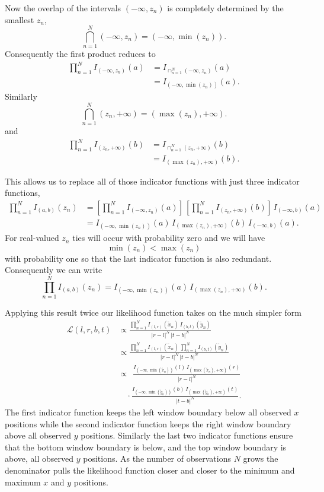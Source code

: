 \documentclass[
  letterpaper,
  DIV=11,
  numbers=noendperiod]{scrartcl}
\begin{document}
Now the overlap of the intervals \((-\infty, z_{n})\) is completely
determined by the smallest \(z_{n}\), \[
\bigcap_{n = 1}^{N} (-\infty, z_{n}) = (-\infty, \min(z_{n})).
\] Consequently the first product reduces to \begin{align*}
\prod_{n = 1}^{N} I_{(-\infty, z_{n})}(a)
&=
I_{ \cap_{n = 1}^{N} (-\infty, z_{n}) }(a)
\\
&=
I_{ (-\infty, \min(z_{n})) }(a).
\end{align*} Similarly \[
\bigcap_{n = 1}^{N} (z_{n}, +\infty) = (\max(z_{n}), +\infty).
\] and \begin{align*}
\prod_{n = 1}^{N} I_{(z_{n}, +\infty)}(b)
&=
I_{ \cap_{n = 1}^{N} (z_{n}, +\infty) }(b)
\\
&=
I_{ (\max(z_{n}), +\infty) }(b).
\end{align*}

This allows us to replace all of those indicator functions with just
three indicator functions, \begin{align*}
\prod_{n = 1}^{N}
I_{(a, b)}(z_{n})
&=
\left[ \prod_{n = 1}^{N} I_{(-\infty, z_{n})}(a) \right] \,
\left[ \prod_{n = 1}^{N} I_{(z_{n}, +\infty)}(b) \right] \,
I_{(-\infty, b)}(a)
\\
&=
I_{ (-\infty, \min(z_{n})) }(a) \,
I_{ (\max(z_{n}), +\infty) }(b) \,
I_{(-\infty, b)}(a).
\end{align*} For real-valued \(z_{n}\) ties will occur with probability
zero and we will have \[
\min(z_{n}) < \max(z_{n})
\] with probability one so that the last indicator function is also
redundant. Consequently we can write \[
\prod_{n = 1}^{N}
I_{(a, b)}(z_{n})
=
I_{ (-\infty, \min(z_{n})) }(a) \,
I_{ (\max(z_{n}), +\infty) }(b).
\]

Applying this result twice our likelihood function takes on the much
simpler form \begin{align*}
\mathcal{L}(l, r, b, t)
&\propto
\frac{
  \prod_{n = 1}^{N} I_{(l, r)}( \tilde{x}_{n}) \, I_{(b, t)}( \tilde{y}_{n})
}
{
  | r - l |^{N} \, | t - b |^{N}
}
\\
&\propto
\frac{
  \prod_{n = 1}^{N} I_{(l, r)}( \tilde{x}_{n}) \,
  \prod_{n = 1}^{N} I_{(b, t)}( \tilde{y}_{n})
}
{
  | r - l |^{N} \, | t - b |^{N}
}
\\
&\propto \;\,
\frac{
  I_{ (-\infty, \min(\tilde{x}_{n})) }(l) \,
  I_{ (\max(\tilde{x}_{n}), +\infty) }(r)
}
{
  | r - l |^{N}
}
\\
&\quad \cdot
\frac{
  I_{ (-\infty, \min(\tilde{y}_{n})) }(b) \,
  I_{ (\max(\tilde{y}_{n}), +\infty) }(t)
}
{
  | t - b |^{N}
}.
\end{align*} The first indicator function keeps the left window boundary
below all observed \(x\) positions while the second indicator function
keeps the right window boundary above all observed \(y\) positions.
Similarly the last two indicator functions ensure that the bottom window
boundary is below, and the top window boundary is above, all observed
\(y\) positions. As the number of observations \(N\) grows the
denominator pulls the likelihood function closer and closer to the
minimum and maximum \(x\) and \(y\) positions.
\end{document}
